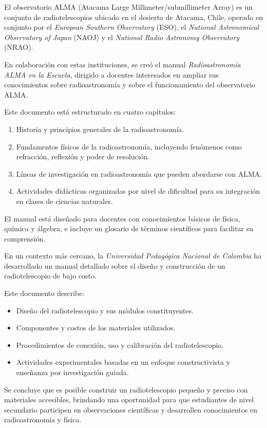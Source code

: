 El observatorio ALMA (Atacama Large Millimeter/submillimeter Array) es un
conjunto de radiotelescopios ubicado en el desierto de Atacama, Chile, operado
en conjunto por el \emph{European Southern Observatory} (ESO),
el \emph{National Astronomical Observatory of Japan} (NAOJ) y
el \emph{National Radio Astronomy Observatory} (NRAO).

En colaboración con estas instituciones, se creó el manual
\emph{Radioastronomía ALMA en la Escuela}, dirigido a docentes interesados en
ampliar sus conocimientos sobre radioastronomía y sobre el funcionamiento del
observatorio ALMA. \parencite{Gallardo2021}

Este documento está estructurado en cuatro capítulos:
\begin{enumerate}
  \item Historia y principios generales de la radioastronomía.
  \item Fundamentos físicos de la radioastronomía, incluyendo fenómenos como
    refracción, reflexión y poder de resolución.
  \item Líneas de investigación en radioastronomía que pueden abordarse con ALMA.
  \item Actividades didácticas organizadas por nivel de dificultad para su
    integración en clases de ciencias naturales.
\end{enumerate}

El manual está diseñado para docentes con conocimientos básicos de física,
química y álgebra, e incluye un glosario de términos científicos para facilitar
su comprensión.

En un contexto más cercano, la \emph{Universidad Pedagógica Nacional de Colombia}
ha desarrollado un manual detallado sobre el diseño y construcción de un
radiotelescopio de bajo costo. \parencite{Penaloza2023}

Este documento describe:

\begin{itemize}
  \item Diseño del radiotelescopio y sus módulos constituyentes.
  \item Componentes y costos de los materiales utilizados.
  \item Procedimientos de conexión, uso y calibración del radiotelescopio.
  \item Actividades experimentales basadas en un enfoque constructivista y
    enseñanza por investigación guiada.
\end{itemize}

Se concluye que es posible construir un radiotelescopio pequeño y preciso con
materiales accesibles, brindando una oportunidad para que estudiantes de nivel
secundario participen en observaciones científicas y desarrollen conocimientos
en radioastronomía y física.

